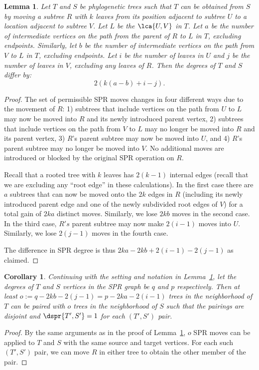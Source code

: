 \documentclass{amsart}
\newtheorem{lemma}[theorem]{Lemma}
\newtheorem{corollary}[theorem]{Corollary}
\begin{document}
\begin{lemma}
\label{lem:degree_change}
Let $T$ and $S$ be phylogenetic trees such that $T$ can be obtained from $S$ by moving a subtree $R$ with $k$ leaves from its position adjacent to subtree $U$ to a location adjacent to subtree $V$.
Let $L$ be the $\lca{U,V}$ in $T$.
Let $a$ be the number of intermediate vertices on the path from the parent of $R$ to $L$ in $T$, excluding endpoints.
Similarly, let $b$ be the number of intermediate vertices on the path from $V$ to $L$ in $T$, excluding endpoints.
Let $i$ be the number of leaves in $U$ and $j$ be the number of leaves in $V$, excluding any leaves of $R$.
Then the degrees of $T$ and $S$ differ by:
$$2\left(k(a-b) + i - j\right).$$

\end{lemma}
\begin{proof}
The set of permissible SPR moves changes in four different ways due to the movement of $R$:
1) subtrees that include vertices on the path from $U$ to $L$ may now be moved into $R$ and its newly introduced parent vertex,
2) subtrees that include vertices on the path from $V$ to $L$ may no longer be moved into $R$ and its parent vertex,
3) $R$'s parent subtree may now be moved into $U$, and
4) $R$'s parent subtree may no longer be moved into $V$.
No additional moves are introduced or blocked by the original SPR operation on $R$.

Recall that a rooted tree with $k$ leaves has $2(k-1)$ internal edges (recall that we are excluding any ``root edge'' in these calculations).
In the first case there are $a$ subtrees that can now be moved onto the $2k$ edges in $R$ (including its newly introduced parent edge and one of the newly subdivided root edges of $V$) for a total gain of $2ka$ distinct moves.
Similarly, we lose $2kb$ moves in the second case.
In the third case, $R's$ parent subtree may now make $2(i-1)$ moves into $U$.
Similarly, we lose $2(j-1)$ moves in the fourth case.

The difference in SPR degree is thus $2ka - 2kb + 2(i-1) - 2(j-1)$ as claimed.
\end{proof}

\begin{corollary}
\label{cor:paired_neighbors}
Continuing with the setting and notation in Lemma~\ref{lem:degree_change}, let the degrees of $T$ and $S$ vertices in the SPR graph be $q$ and $p$ respectively.
Then at least $o := q - 2kb - 2(j-1) = p - 2ka - 2(i-1)$ trees in the neighborhood of $T$ can be paired with $o$ trees in the neighborhood of $S$ such that the pairings are disjoint and $\dspr{T',S'} = 1$ for each $(T',S')$ pair.
\end{corollary}
\begin{proof}
By the same arguments as in the proof of Lemma~\ref{lem:degree_change}, $o$ SPR moves can be applied to $T$ and $S$ with the same source and target vertices.
For each such $(T',S')$ pair, we can move $R$ in either tree to obtain the other member of the pair.
\end{proof}
\end{document}
